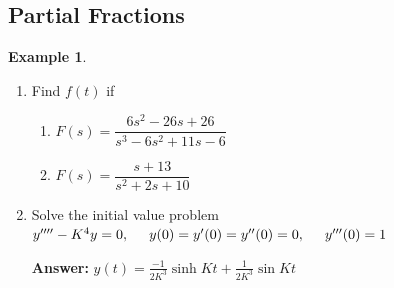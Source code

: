\documentclass[11pt,a4paper]{article}
\theoremstyle{definition}
\newtheorem{exa}[thm]{Example}
\begin{document}
{\color[wave]{485}\subsection{Partial Fractions}}
\begin{exa}
\begin{enumerate}
\item Find $f(t) $ if
\begin{enumerate}
      \item $F(s) = \dfrac{6s^2 -26s + 26}{s^3 - 6s^2 + 11s -6}$

      \item $F(s) = \dfrac{s + 13}{s^2 + 2s + 10}$
\end{enumerate}
\item Solve the initial value problem $y'''' - K^4y = 0,\hspace{0.5cm} y(0) =y'(0) =y''(0)=0,\hspace{0.5cm} y'''(0) =1$

\textbf{Answer:} $\displaystyle{y(t) = \frac{-1}{2K^3}\sinh Kt + \frac{1}{2K^3}\sin Kt}$
\end{enumerate}
\end{exa}
\end{document}
